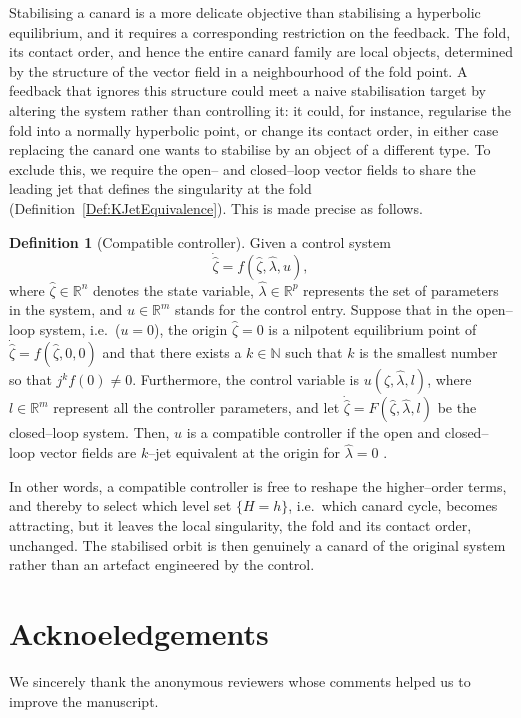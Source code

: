 \documentclass[3p]{elsarticle}
\theoremstyle{plain}
\theoremstyle{remark}
\theoremstyle{definition}
\newtheorem{definition}{Definition}[section]
\begin{document}
       Stabilising a canard is a more delicate objective than stabilising a hyperbolic
equilibrium, and it requires a corresponding restriction on the feedback. The
fold, its contact order, and hence the entire canard family are local objects, determined
by the structure of the vector field in a neighbourhood of the fold point. A feedback that
ignores this structure could meet a naive stabilisation target by altering the system
rather than controlling it: it could, for instance, regularise the fold into a normally
hyperbolic point, or change its contact order, in either case replacing the canard one wants to stabilise by an object of a different type. To
exclude this, we require the open-- and closed--loop vector fields to share the leading
jet that defines the singularity at the fold (Definition~\ref{Def:KJetEquivalence}). This is made precise as follows.

\begin{definition}[Compatible controller]
Given a control system
\[
  \dot{\hat\zeta} = f(\hat\zeta,\hat\lambda,u),
\]
where $\hat\zeta\in\mathbb R^{n}$ denotes the state variable, $\hat\lambda\in\mathbb R^{p}$
represents the set of parameters in the system, and $u\in\mathbb R^{m}$ stands for the
control entry. Suppose that in the open--loop system, i.e.\ ($u=0$), the origin
$\hat\zeta=0$ is a nilpotent equilibrium point of $\dot{\hat\zeta}=f(\hat\zeta,0,0)$ and
that there exists a $k\in\mathbb N$ such that $k$ is the smallest number so that
$j^{k}f(0)\neq 0$. Furthermore, the control variable is $u(\hat\zeta,\hat\lambda,l)$, where
$l\in\mathbb R^{m}$ represent all the controller parameters, and let
$\dot{\hat\zeta}=F(\hat\zeta,\hat\lambda,l)$ be the closed--loop system. Then, $u$ is a
compatible controller if the open and closed--loop vector fields are $k$--jet equivalent at
the origin for $\hat\lambda=0$ \cite{Ref:JardonKojakhmetov2022}.
\end{definition}

In other words, a compatible controller is free to reshape the higher--order terms,
and thereby to select which level set $\{H=h\}$, i.e.\ which canard cycle, becomes
attracting, but it leaves the local singularity, the fold and its contact order, unchanged.
The stabilised orbit is then genuinely a canard of the original system rather than an artefact engineered by the control. 
        


\section*{Acknoeledgements}
We sincerely thank the anonymous reviewers whose comments helped us to improve the manuscript.




\end{document}
